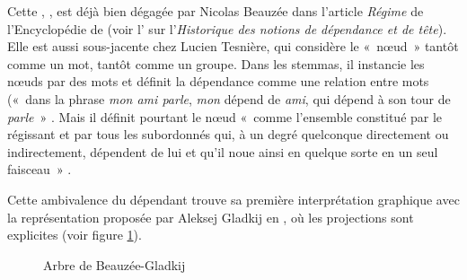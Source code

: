 Cette , , est déjà bien dégagée par Nicolas Beauzée dans l’article \textit{Régime} de l’Encyclopédie de \citeyear{Beauzée1765} (voir l’ sur l’\textit{Historique des notions de dépendance et de tête}). Elle est aussi sous-jacente chez Lucien Tesnière, qui considère le «~nœud~» tantôt comme un mot, tantôt comme un groupe. Dans les stemmas, il instancie les nœuds par des mots et définit la dépendance comme une relation entre mots («~dans la phrase \textit{mon ami parle}, \textit{mon} dépend de \textit{ami}, qui dépend à son tour de \textit{parle}~» \citep[chapitre 2]{tesniere1959elements}. Mais il définit pourtant le nœud «~comme l’ensemble constitué par le régissant et par tous les subordonnés qui, à un degré quelconque directement ou indirectement, dépendent de lui et qu’il noue ainsi en quelque sorte en un seul faisceau~» \citep[chapitre 3]{tesniere1959elements}.
 
Cette ambivalence du dépendant trouve sa première interprétation graphique avec la représentation proposée par Aleksej Gladkij en \citeyear{gladkij1968describing}, où les projections sont explicites (voir figure \ref{fig:laponie-gladkij}).

\begin{figure}
\caption{\label{fig:laponie-gladkij}Arbre de Beauzée-Gladkij}
\end{figure}

